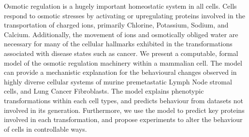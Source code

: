 Osmotic regulation is a hugely important homeostatic system in all cells. Cells respond to osmotic stresses by activating or upregulating proteins involved in the transportation of charged ions, primarily Chlorine, Potassium, Sodium, and Calcium. Additionally, the movement of ions and osmotically obliged water are necessary for many of the cellular hallmarks exhibited in the transformations associated with disease states such as cancer. We present a computable, formal model of the osmotic regulation machinery within a mammalian cell. The model can provide a mechanistic explanation for the behavioural changes observed in highly diverse cellular systems of murine premetastatic Lymph Node stromal cells, and Lung Cancer Fibroblasts. The model explains phenotypic transformations within each cell types, and predicts behaviour from datasets not involved in its generation. Furthermore, we use the model to predict key proteins involved in each transformation, and propose experiments to alter the behaviour of cells in controllable ways.